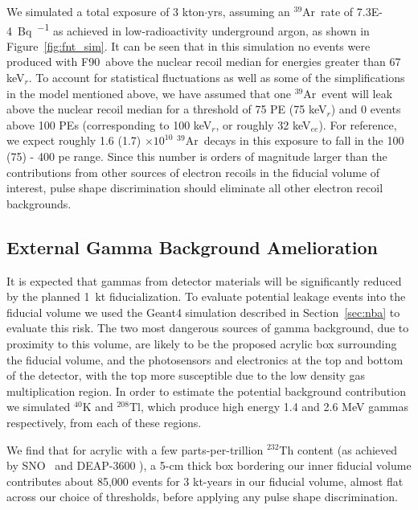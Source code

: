 \documentclass[a4paper,11pt]{article}
\newcommand{\artn}{$^{39}$Ar}
\newcommand{\fnt}{F90}
\begin{document}
We simulated a total exposure of 3 kton$\cdot$yrs, assuming an \artn~rate of \SI{7.3E-4}{\becquerel\per\kgar} as achieved in low-radioactivity underground argon, as shown in Figure~\ref{fig:fnt_sim}. It can be seen that in this simulation no events were produced with \fnt~above the nuclear recoil median for energies greater than 67 keV$_r$. To account for statistical fluctuations as well as some of the simplifications in the model mentioned above, we have assumed that one \artn~event will leak above the nuclear recoil median for a threshold of 75 PE (75 keV$_r$) and 0 events above 100 PEs (corresponding to 100 keV$_r$, or roughly 32 keV$_{ee}$). For reference, we expect roughly 1.6 (1.7) $\times10^{10}$ \artn~decays in this exposure to fall in the 100 (75) - 400 pe range. Since this number is orders of magnitude larger than the contributions from other sources of electron recoils in the fiducial volume of interest, pulse shape discrimination should eliminate all other electron recoil backgrounds.

\subsection{External Gamma Background Amelioration}
\label{sec:gamma_bkgd_calc}
It is expected that gammas from detector materials will be significantly reduced by the planned 1~kt fiducialization. To evaluate potential leakage events into the fiducial volume we used the Geant4 simulation described in Section~\ref{sec:nba} to evaluate this risk. The two most dangerous sources of gamma background, due to proximity to this volume, are likely to be the proposed acrylic box surrounding the fiducial volume, and the photosensors and electronics at the top and bottom of the detector, with the top more susceptible due to the low density gas multiplication region. In order to estimate the potential background contribution we simulated $^{40}$K and $^{208}$Tl, which produce high energy 1.4 and 2.6 MeV gammas respectively, from each of these regions.

We find that for acrylic with a few parts-per-trillion $^{232}$Th content (as achieved by SNO~\cite{acrylic} and DEAP-3600 \cite{deapacrylic}), a 5-cm thick box bordering our inner fiducial volume contributes about 
85,000 events for 3 kt-years in our fiducial volume, almost flat across our choice of thresholds, before applying any pulse shape discrimination.
\end{document}
